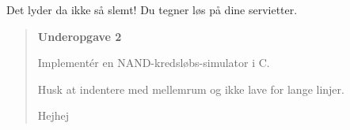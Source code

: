 Det lyder da ikke så slemt!  Du tegner løs på dine servietter.

\begin{quote}

{\em

\textbf{Underopgave 2}

Implementér en NAND-kredsløbs-simulator i C.  

Husk at indentere med mellemrum og ikke lave for lange linjer.

Hejhej}

\end{quote}










